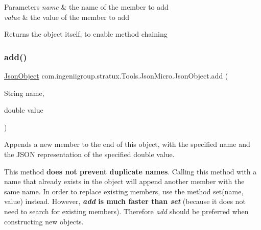 \begin{DoxyParams}{Parameters}
{\em name} & the name of the member to add \\
\hline
{\em value} & the value of the member to add \\
\hline
\end{DoxyParams}
\begin{DoxyReturn}{Returns}
the object itself, to enable method chaining 
\end{DoxyReturn}
\mbox{\label{classcom_1_1ingeniigroup_1_1stratux_1_1_tools_1_1_json_micro_1_1_json_object_a4ed71ed5f66d92257f847e6e57192b63}} 
\subsubsection{\texorpdfstring{add()}{add()}\hspace{0.1cm}{\footnotesize\ttfamily [4/7]}}
{\footnotesize\ttfamily \hyperlink{classcom_1_1ingeniigroup_1_1stratux_1_1_tools_1_1_json_micro_1_1_json_object}{Json\+Object} com.\+ingeniigroup.\+stratux.\+Tools.\+Json\+Micro.\+Json\+Object.\+add (\begin{DoxyParamCaption}\item[{String}]{name,  }\item[{double}]{value }\end{DoxyParamCaption})}

Appends a new member to the end of this object, with the specified name and the J\+S\+ON representation of the specified {\ttfamily double} value. 

This method {\bfseries does not prevent duplicate names}. Calling this method with a name that already exists in the object will append another member with the same name. In order to replace existing members, use the method {\ttfamily set(name, value)} instead. However, {\bfseries  {\itshape add} is much faster than {\itshape set}} (because it does not need to search for existing members). Therefore {\itshape add} should be preferred when constructing new objects. 


